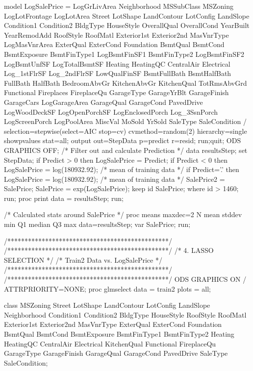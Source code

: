 model LogSalePrice = LogGrLivArea Neighborhood MSSubClass MSZoning LogLotFrontage LogLotArea 
Street LotShape LandContour LotConfig LandSlope Condition1 Condition2 BldgType HouseStyle 
OverallQual OverallCond YearBuilt YearRemodAdd RoofStyle RoofMatl Exterior1st Exterior2nd 
MasVnrType LogMasVnrArea ExterQual ExterCond Foundation BsmtQual BsmtCond BsmtExposure 
BsmtFinType1 LogBsmtFinSF1 BsmtFinType2 LogBsmtFinSF2 LogBsmtUnfSF LogTotalBsmtSF Heating 
HeatingQC CentralAir Electrical Log_1stFlrSF Log_2ndFlrSF LowQualFinSF BsmtFullBath BsmtHalfBath 
FullBath HalfBath BedroomAbvGr KitchenAbvGr KitchenQual TotRmsAbvGrd 
Functional Fireplaces FireplaceQu GarageType GarageYrBlt GarageFinish GarageCars LogGarageArea 
GarageQual GarageCond PavedDrive LogWoodDeckSF LogOpenPorchSF LogEnclosedPorch Log_3SsnPorch 
LogScreenPorch LogPoolArea MiscVal MoSold YrSold SaleType SaleCondition 
/ selection=stepwise(select=AIC stop=cv) cvmethod=random(2) hierarchy=single showpvalues stat=all;
output out=StepData p=predict r=resid;
run;quit;
ODS GRAPHICS OFF; 
/* Filter out and calculate Prediction */
data resultsStep;
	set StepData;
	if Predict > 0 then LogSalePrice = Predict;
	if Predict < 0 then LogSalePrice = log(180932.92); /* mean of training data */
	if Predict='.' then LogSalePrice = log(180932.92); /* mean of training data */
	SalePrice2 = SalePrice;
	SalePrice = exp(LogSalePrice);
	keep id SalePrice;
	where id > 1460;
run;
proc print data = resultsStep;
run;

/* Calculated stats around SalePrice */
proc means maxdec=2 N mean stddev min Q1 median Q3 max data=resultsStep;
var SalePrice;
run;

/***********************************************/
/***********************************************/
/*             4. LASSO SELECTION              */
/*         Train2 Data vs. LogSalePrice        */
/***********************************************/
/***********************************************/
ODS GRAPHICS ON / ATTRPRIORITY=NONE; 
proc glmselect data = train2 plots = all;  

class MSZoning Street LotShape LandContour LotConfig LandSlope Neighborhood 
Condition1 Condition2 BldgType HouseStyle RoofStyle RoofMatl Exterior1st Exterior2nd 
MasVnrType ExterQual ExterCond Foundation BsmtQual BsmtCond BsmtExposure BsmtFinType1 
BsmtFinType2 Heating HeatingQC CentralAir Electrical KitchenQual Functional FireplaceQu 
GarageType GarageFinish GarageQual GarageCond PavedDrive
SaleType SaleCondition; 

